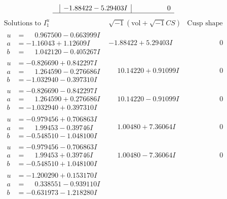 \documentclass[1p]{elsarticle_modified}
\theoremstyle{definition}
\newcommand{\I}{\sqrt{-1}}
\begin{document}
$$\begin{array}{c|c|c}
 & -1.88422 - 5.29403 I & \phantom{-0.000000 } 0\\
 \hline 
 \end{array}$$\newpage$$\begin{array}{c|c|c}  
\text{Solutions to }I^u_{1}& \I (\text{vol} + \sqrt{-1}CS) & \text{Cusp shape}\\
 \hline 
\begin{aligned}
u &= \phantom{-}0.967500 - 0.663999 I \\
a &= -1.16043 + 1.12609 I \\
b &= \phantom{-}1.042120 - 0.405267 I\end{aligned}
 & -1.88422 + 5.29403 I & \phantom{-0.000000 } 0 \\ \hline\begin{aligned}
u &= -0.826690 + 0.842297 I \\
a &= \phantom{-}1.264590 - 0.276686 I \\
b &= -1.032940 - 0.397310 I\end{aligned}
 & \phantom{-}10.14220 + 0.91099 I & \phantom{-0.000000 } 0 \\ \hline\begin{aligned}
u &= -0.826690 - 0.842297 I \\
a &= \phantom{-}1.264590 + 0.276686 I \\
b &= -1.032940 + 0.397310 I\end{aligned}
 & \phantom{-}10.14220 - 0.91099 I & \phantom{-0.000000 } 0 \\ \hline\begin{aligned}
u &= -0.979456 + 0.706863 I \\
a &= \phantom{-}1.99453 - 0.39746 I \\
b &= -0.548510 - 1.048100 I\end{aligned}
 & \phantom{-}1.00480 + 7.36064 I & \phantom{-0.000000 } 0 \\ \hline\begin{aligned}
u &= -0.979456 - 0.706863 I \\
a &= \phantom{-}1.99453 + 0.39746 I \\
b &= -0.548510 + 1.048100 I\end{aligned}
 & \phantom{-}1.00480 - 7.36064 I & \phantom{-0.000000 } 0 \\ \hline\begin{aligned}
u &= -1.200290 + 0.153170 I \\
a &= \phantom{-}0.338551 - 0.939110 I \\
b &= -0.631973 - 1.218280 I\end{aligned}

\end{array}$$
\end{document}
